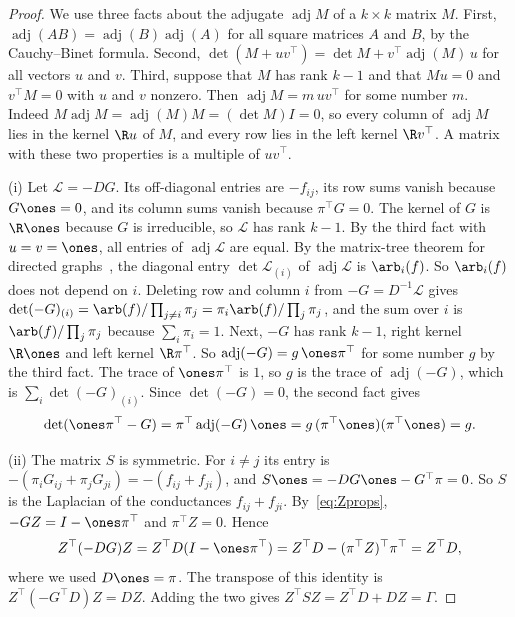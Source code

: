 \begin{proof}
We use three facts about the adjugate $\operatorname{adj}M$ of a $k\times k$ matrix $M$. First,
$\operatorname{adj}(AB)=\operatorname{adj}(B)\operatorname{adj}(A)$ for all square matrices $A$
and $B$, by the Cauchy--Binet formula. Second,
$\det(M+uv^\top)=\det M+v^\top\operatorname{adj}(M)\,u$ for all vectors $u$ and $v$. Third,
suppose that $M$ has rank $k-1$ and that $Mu=0$ and $v^\top M=0$ with $u$ and $v$ nonzero. Then
$\operatorname{adj}M=m\,uv^\top$ for some number $m$. Indeed
$M\operatorname{adj}M=\operatorname{adj}(M)M=(\det M)I=0$, so every column of
$\operatorname{adj}M$ lies in the kernel $\R u$ of $M$, and every row lies in the left kernel
$\R v^\top$. A matrix with these two properties is a multiple of $uv^\top$.

(i) Let $\mathcal L=-DG$. Its off-diagonal entries are $-f_{ij}$, its row sums vanish because
$G\ones=0$, and its column sums vanish because $\pi^\top G=0$. The kernel of $G$ is $\R\ones$
because $G$ is irreducible, so $\mathcal L$ has rank $k-1$. By the third fact with
$u=v=\ones$, all entries of $\operatorname{adj}\mathcal L$ are equal. By the matrix-tree theorem
for directed graphs~\cite{tutte1948,chaiken1982}, the diagonal entry
$\det\mathcal L_{(i)}$ of $\operatorname{adj}\mathcal L$ is $\arb_i(f)$. So $\arb_i(f)$ does
not depend on $i$. Deleting row and column $i$ from $-G=D^{-1}\mathcal L$ gives
$\det(-G)_{(i)}=\arb(f)/\prod_{j\ne i}\pi_j=\pi_i\arb(f)/\prod_j\pi_j$, and the sum over $i$ is
$\arb(f)/\prod_j\pi_j$ because $\sum_i\pi_i=1$. Next, $-G$ has rank $k-1$, right kernel
$\R\ones$ and left kernel $\R\pi^\top$. So $\operatorname{adj}(-G)=g\,\ones\pi^\top$ for some
number $g$ by the third fact. The trace of $\ones\pi^\top$ is $1$, so $g$ is the trace of
$\operatorname{adj}(-G)$, which is $\sum_i\det(-G)_{(i)}$. Since $\det(-G)=0$, the second fact
gives
\[
\det(\ones\pi^\top-G)=\pi^\top\operatorname{adj}(-G)\,\ones=g\,(\pi^\top\ones)(\pi^\top\ones)=g .
\]

(ii) The matrix $S$ is symmetric. For $i\ne j$ its entry is $-(\pi_iG_{ij}+\pi_jG_{ji})
=-(f_{ij}+f_{ji})$, and $S\ones=-DG\ones-G^\top\pi=0$. So $S$ is the Laplacian of the
conductances $f_{ij}+f_{ji}$. By~\eqref{eq:Zprops}, $-GZ=I-\ones\pi^\top$ and $\pi^\top Z=0$.
Hence
\[
Z^\top(-DG)Z=Z^\top D(I-\ones\pi^\top)=Z^\top D-(\pi^\top Z)^\top\pi^\top=Z^\top D,
\]
where we used $D\ones=\pi$. The transpose of this identity is $Z^\top(-G^\top D)Z=DZ$. Adding
the two gives $Z^\top SZ=Z^\top D+DZ=\Gamma$.


\end{proof}
